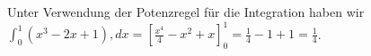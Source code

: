 Unter Verwendung der Potenzregel für die Integration haben wir $\int_{0}^{1} (x^3 - 2x + 1), dx = \left[\frac{x^4}{4} - x^2 + x\right]_{0}^{1} = \frac{1}{4} - 1 + 1 = \frac{1}{4}$.
